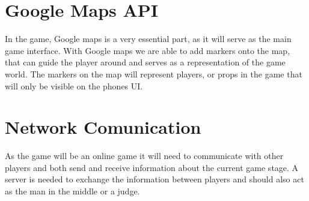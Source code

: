 



\section{Google Maps API}

In the game, Google maps is a very essential part, as it will serve as the main game interface. With Google maps we are able to add markers onto the map\cite{GooglemapMarkers}, that can guide the player around and serves as a representation of the game world. The markers on the map will represent players, or props in the game that will only be visible on the phones UI.


\section{Network Comunication}

As the game will be an online game it will need to communicate with other players and both send and receive information about the current game stage. A server is needed to exchange the information between players and should also act as the man in the middle or a judge. 

